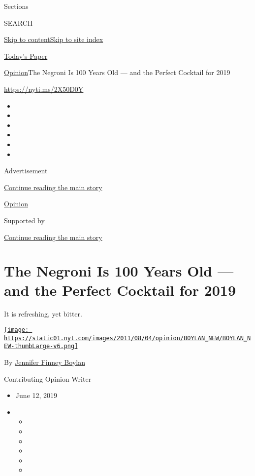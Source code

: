 Sections

SEARCH

\protect\hyperlink{site-content}{Skip to
content}\protect\hyperlink{site-index}{Skip to site index}

\href{https://myaccount.nytimes.com/auth/login?response_type=cookie\&client_id=vi}{}

\href{https://www.nytimes.com/section/todayspaper}{Today's Paper}

\href{/section/opinion}{Opinion}\textbar{}The Negroni Is 100 Years Old
--- and the Perfect Cocktail for 2019

\url{https://nyti.ms/2X50D0Y}

\begin{itemize}
\item
\item
\item
\item
\item
\item
\end{itemize}

Advertisement

\protect\hyperlink{after-top}{Continue reading the main story}

\href{/section/opinion}{Opinion}

Supported by

\protect\hyperlink{after-sponsor}{Continue reading the main story}

\hypertarget{the-negroni-is-100-years-old--and-the-perfect-cocktail-for-2019}{%
\section{The Negroni Is 100 Years Old --- and the Perfect Cocktail for
2019}\label{the-negroni-is-100-years-old--and-the-perfect-cocktail-for-2019}}

It is refreshing, yet bitter.

\href{https://topics.nytimes.com/top/reference/timestopics/people/b/jennifer_finney_boylan/index.html}{\texttt{[image: https://static01.nyt.com/images/2011/08/04/opinion/BOYLAN\_NEW/BOYLAN\_NEW-thumbLarge-v6.png]}}

By
\href{https://topics.nytimes.com/top/reference/timestopics/people/b/jennifer_finney_boylan/index.html}{Jennifer
Finney Boylan}

Contributing Opinion Writer

\begin{itemize}
\item
  June 12, 2019
\item
  \begin{itemize}
  \item
  \item
  \item
  \item
  \item
  \item
  \end{itemize}
\end{itemize}

